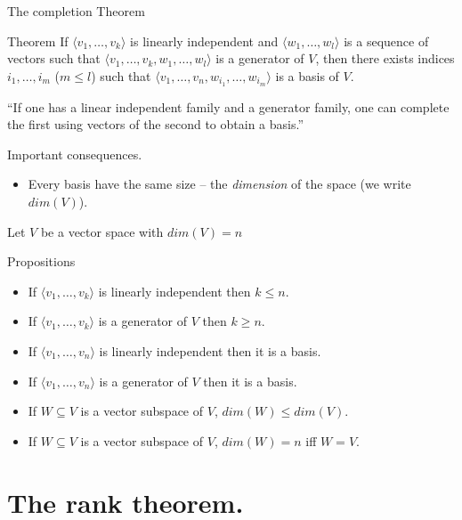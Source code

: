 \documentclass{beamer}
\begin{document}
\begin{frame}{The completion Theorem}
  \begin{block}{Theorem}
    If $\langle v_1, \dots, v_k \rangle$ is linearly independent and $\langle w_1, \dots, w_l \rangle$ is a sequence of vectors such that $\langle v_1, \dots, v_k, w_1, \dots, w_l \rangle$ is a generator of $V$, then there exists indices $i_1, \dots, i_m$ ($m \le l$) such that $\langle v_1, \dots, v_n, w_{i_1}, \dots, w_{i_m} \rangle$ is a basis of $V$.
  \end{block}

  \alert{``If one has a linear independent family and a generator family, one can complete the first using vectors of the second to obtain a basis.''}
\end{frame}

\begin{frame}{Important consequences.}
  \begin{itemize}
  \item Every basis have the same size -- the \emph{dimension} of the space (we write $dim(V)$).
  \end{itemize}
  Let $V$ be a vector space with $dim(V) = n$
  \begin{block}{Propositions}
    \begin{itemize}
    \item If $\langle v_1, \dots, v_k \rangle$ is linearly independent then $k \le n$.
    \item If $\langle v_1, \dots, v_k \rangle$ is a generator of $V$ then $k \ge n$.
    \item If $\langle v_1, \dots, v_n \rangle$ is linearly independent then it is a basis.
    \item If $\langle v_1, \dots, v_n \rangle$ is a generator of $V$ then it is a basis.
    \item If $W \subseteq V$ is a vector subspace of $V$, $dim(W) \le dim(V)$.
    \item If $W \subseteq V$ is a vector subspace of $V$, $dim(W) = n$ iff $W = V$.
    \end{itemize}
  \end{block}
\end{frame}


\section{The rank theorem.}
\end{document}
